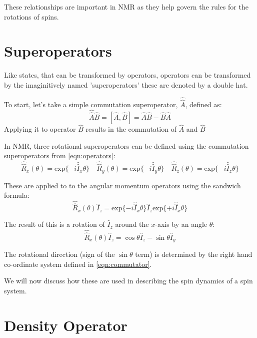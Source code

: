 These relationships are important in NMR as they help govern the rules for the rotations of spins.

\section{Superoperators}

Like states, that can be transformed by operators, operators can be transformed by the imaginitively
named 'superoperators' these are denoted by a double hat.

To start, let's take a simple commutation superoperator, $\hat\hat{A}$, defined as:
\begin{equation}
  \hat{\hat{A}}\hat{B} = [\hat{A},\hat{B}] = \hat{A}\hat{B} - \hat{B}\hat{A}
\end{equation}
Applying it to operator $\hat{B}$ results in the commutation of $\hat{A}$ and $\hat{B}$

In NMR, three rotational superoperators can be defined using the commutation superoperators from \ref{eqn:operators}:
\begin{equation}
 \hat{\hat{R}}_x(\theta) = \text{exp}\{-i\hat{\hat{I}}_x\theta\}\quad\hat{\hat{R}}_y(\theta) = \text{exp}\{-i\hat{\hat{I}}_y\theta\}\quad\hat{\hat{R}}_z(\theta) = \text{exp}\{-i\hat{\hat{I}}_z\theta\}
\end{equation}

These are applied to to the angular momentum operators using the sandwich formula:
\begin{equation}
  \hat{\hat{R}}_x(\theta)\hat{I}_z = \text{exp}\{-i\hat{\hat{I}}_x\theta\}\hat{I}_z\text{exp}\{+i\hat{\hat{I}}_x\theta\}
\end{equation}

The result of this is a rotation of $\hat{I}_z$ around the $x$-axis by an angle $\theta$:
\begin{equation}
  \hat{\hat{R}}_x(\theta)\hat{I}_z = \cos{\theta}\hat{I}_z - \sin{\theta}\hat{I}_y
\end{equation}

The rotational direction (sign of the $\sin{\theta}$ term) is determined by the right hand co-ordinate system defined in \ref{eqn:commutator}.

We will now discuss how these are used in describing the spin dynamics of a spin system.

\section{Density Operator}

